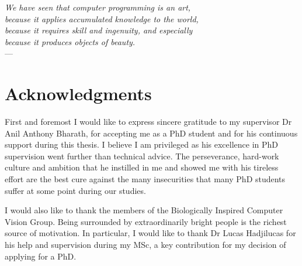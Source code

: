 
\begin{flushright}{\slshape    
    We have seen that computer programming is an art, \\ 
    because it applies accumulated knowledge to the world, \\ 
    because it requires skill and ingenuity, and especially \\
    because it produces objects of beauty.} \\ \medskip
    ---  \citep{knuth:1974}
\end{flushright}



\bigskip

\begingroup
\let\clearpage\relax
\let\cleardoublepage\relax
\let\cleardoublepage\relax
\chapter*{Acknowledgments}

First and foremost I would like to express sincere gratitude to my supervisor Dr Anil Anthony Bharath, for accepting me as a PhD student and for his continuous support during this thesis. I believe I am privileged as his excellence in PhD supervision went further than technical advice. The perseverance, hard-work culture and ambition that he instilled in me and showed me with his tireless effort are the best cure against the many insecurities that many PhD students suffer at some point during our studies.

I would also like to thank the members of the Biologically Inspired Computer Vision Group. Being surrounded by extraordinarily bright people is the richest source of motivation. In particular, I would like to thank Dr Lucas Hadjilucas for his help and supervision during my MSc, a key contribution for my decision of applying for a PhD. 
\endgroup



